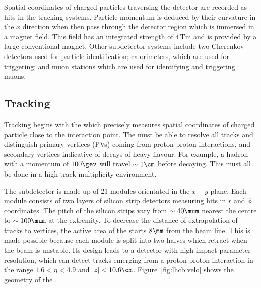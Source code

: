 Spatial coordinates of charged particles traversing the detector are recorded as hits in the
tracking systems.
Particle momentum is deduced by their curvature in the $x$ direction when then pass through the
detector region which is immersed in a magnet field.
This field has an integrated strength of $4\,\mathrm{Tm}$ and is provided by a large conventional
magnet.
Other subdetector systems include two Cherenkov detectors used for particle identification;
calorimeters, which are used for triggering; and muon stations which are used for identifying and
triggering muons.



\subsection{Tracking}
Tracking begins with the \velo which precisely measures spatial
coordinates of charged particle close to the interaction point.
The \velo must be able to resolve all tracks and distinguish primary vertices (PVs) coming from
proton-proton interactions, and secondary vertices indicative of decays of heavy flavour.
For example, a \Bp hadron with a momentum of $100\gev$ will travel $\sim1\cm$ before decaying.
This must all be done in a high track multiplicity environment.


The \velo subdetector is made up of 21 modules orientated in the $x-y$ plane.
Each module consists of two layers of silicon strip detectors measuring hits in $r$ and $\phi$
coordinates.
The pitch of the silicon strips vary from $\sim40\mum$ nearest the centre to $\sim100\mum$ at the
extremity.
To decrease the distance of extrapolation of tracks to vertices,
the active area of the \velo starts $8\mm$ from the beam line.
This is made possible because each module is split into two halves which retract when the \lhc beam
is unstable.
Its design leads to a detector with high impact parameter resolution, which can detect tracks
emerging from a proton-proton interaction in the range $1.6<\eta<4.9$ and $|z|<10.6\cm$.
Figure~\ref{fig:lhcb:velo} shows the geometry of the \velo.

